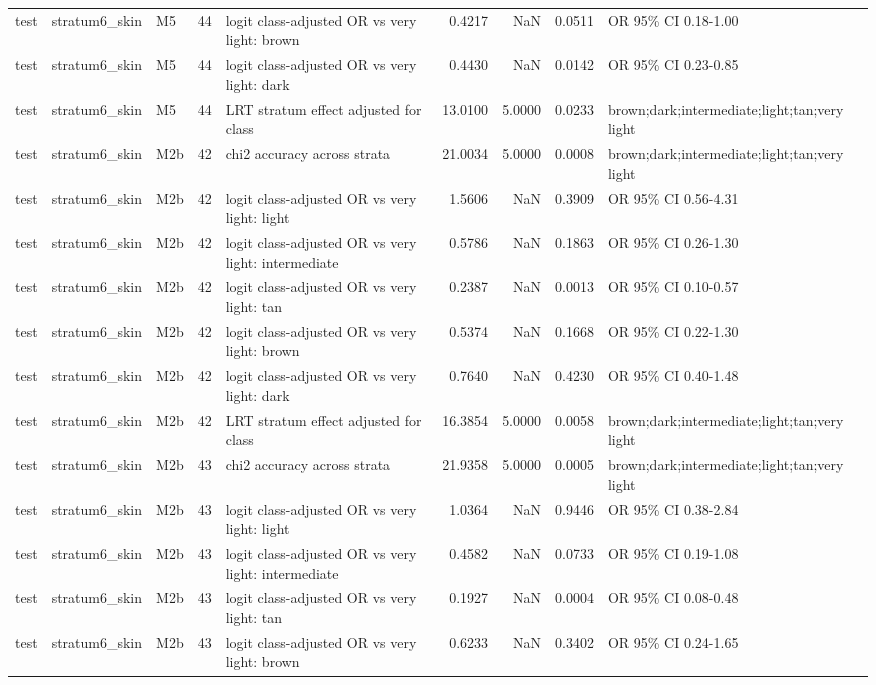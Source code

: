 \begin{tabular}{lllrlrrrl}
test & stratum6\_skin & M5 & 44 & logit class-adjusted OR vs very light: brown & 0.4217 & NaN & 0.0511 & OR 95\% CI 0.18-1.00 \\
test & stratum6\_skin & M5 & 44 & logit class-adjusted OR vs very light: dark & 0.4430 & NaN & 0.0142 & OR 95\% CI 0.23-0.85 \\
test & stratum6\_skin & M5 & 44 & LRT stratum effect adjusted for class & 13.0100 & 5.0000 & 0.0233 & brown;dark;intermediate;light;tan;very light \\
test & stratum6\_skin & M2b & 42 & chi2 accuracy across strata & 21.0034 & 5.0000 & 0.0008 & brown;dark;intermediate;light;tan;very light \\
test & stratum6\_skin & M2b & 42 & logit class-adjusted OR vs very light: light & 1.5606 & NaN & 0.3909 & OR 95\% CI 0.56-4.31 \\
test & stratum6\_skin & M2b & 42 & logit class-adjusted OR vs very light: intermediate & 0.5786 & NaN & 0.1863 & OR 95\% CI 0.26-1.30 \\
test & stratum6\_skin & M2b & 42 & logit class-adjusted OR vs very light: tan & 0.2387 & NaN & 0.0013 & OR 95\% CI 0.10-0.57 \\
test & stratum6\_skin & M2b & 42 & logit class-adjusted OR vs very light: brown & 0.5374 & NaN & 0.1668 & OR 95\% CI 0.22-1.30 \\
test & stratum6\_skin & M2b & 42 & logit class-adjusted OR vs very light: dark & 0.7640 & NaN & 0.4230 & OR 95\% CI 0.40-1.48 \\
test & stratum6\_skin & M2b & 42 & LRT stratum effect adjusted for class & 16.3854 & 5.0000 & 0.0058 & brown;dark;intermediate;light;tan;very light \\
test & stratum6\_skin & M2b & 43 & chi2 accuracy across strata & 21.9358 & 5.0000 & 0.0005 & brown;dark;intermediate;light;tan;very light \\
test & stratum6\_skin & M2b & 43 & logit class-adjusted OR vs very light: light & 1.0364 & NaN & 0.9446 & OR 95\% CI 0.38-2.84 \\
test & stratum6\_skin & M2b & 43 & logit class-adjusted OR vs very light: intermediate & 0.4582 & NaN & 0.0733 & OR 95\% CI 0.19-1.08 \\
test & stratum6\_skin & M2b & 43 & logit class-adjusted OR vs very light: tan & 0.1927 & NaN & 0.0004 & OR 95\% CI 0.08-0.48 \\
test & stratum6\_skin & M2b & 43 & logit class-adjusted OR vs very light: brown & 0.6233 & NaN & 0.3402 & OR 95\% CI 0.24-1.65 \\

\end{tabular}
